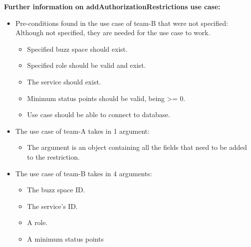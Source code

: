 \noindent
\textbf{Further information on addAuthorizationRestrictions use case:}
\begin{itemize}
	\item	Pre-conditions found in the use case of team-B that were not specified:
	\textnormal{Although not specified, they are needed for the use case to work.}
		\begin{itemize}
		\item Specified buzz space should exist.  
		\item Specified role should be valid and exist.
		\item The service should exist.
		\item Minimum status points should be valid, being >= 0.
		\item Use case should be able to connect to database. 
		\end{itemize}
	\item The use case of team-A takes in 1 argument:
		\begin{itemize}
		\item The argument is an object containing all the fields that need to be added to the restriction.
		
		\end{itemize}
	\item The use case of team-B takes in 4 arguments:
		\begin{itemize}
		\item The buzz space ID.
		\item The service's ID.
		\item A role.
		\item A minimum status points		
		\end{itemize}
	  

\end{itemize}





